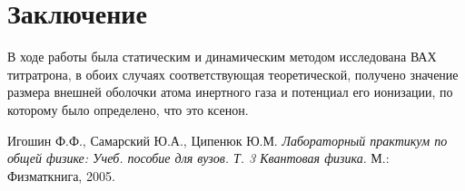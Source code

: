 \documentclass[a4paper,12pt]{article}
\begin{document}
\section*{Заключение}
В ходе работы была статическим и динамическим методом исследована ВАХ титратрона, в обоих случаях соответствующая теоретической, получено значение размера внешней оболочки атома инертного газа и потенциал его ионизации, по которому было определено, что это ксенон.
\begin{thebibliography}{9}
Игошин Ф.Ф., Самарский Ю.А., Ципенюк Ю.М. 
\textit{Лабораторный практикум по общей физике: Учеб. пособие для вузов. Т. 3 Квантовая физика}. 
М.: Физматкнига, 2005.
\end{thebibliography}
\end{document}
